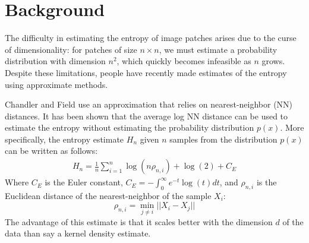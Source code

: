 \documentclass[10pt,twocolumn,letterpaper]{article}
\begin{document}



\section{Background}
The difficulty in estimating the entropy of image patches arises due to the curse of dimensionality: for patches of size $n\times n$, we must estimate a probability distribution with dimension $n^2$, which quickly becomes infeasible as $n$ grows. Despite these limitations, people have recently made estimates of the entropy using approximate methods.

Chandler and Field use an approximation that relies on nearest-neighbor (NN) distances. It has been shown \cite{entropyest} that the average log NN distance can be used to estimate the entropy without estimating the probability distribution $p(x)$. More specifically, the entropy estimate $H_n$ given $n$ samples from the distribution $p(x)$ can be written as follows:
\begin{eqnarray}
    H_n = \frac{1}{n}\sum_{i=1}^n \log(n\rho_{n,i}) + \log(2) + C_E
\end{eqnarray}
Where $C_E$ is the Euler constant, $C_E = -\int_0^\infty e^{-t} \log(t) dt$, and $\rho_{n,i}$ is the Euclidean distance of the nearest-neighbor of the sample $X_i$:
$$ \rho_{n,i} = \min_{j\neq i} ||X_i - X_j||$$
\noindent The advantage of this estimate is that it scales better with the dimension $d$ of the data than say a kernel density estimate.


\end{document}
